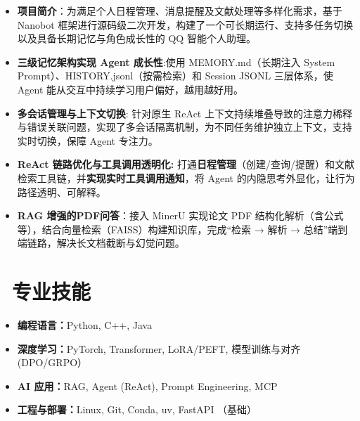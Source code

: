 \documentclass{resume}
\begin{document}
\begin{itemize}
  \item \textbf{项目简介}：为满足个人日程管理、消息提醒及文献处理等多样化需求，基于 Nanobot 框架进行源码级二次开发，构建了一个可长期运行、支持多任务切换以及具备长期记忆与角色成长性的 QQ 智能个人助理。
  \item \textbf{三级记忆架构实现 Agent 成长性}:使用 MEMORY.md（长期注入 System Prompt）、HISTORY.jsonl（按需检索）和 Session JSONL 三层体系，使 Agent 能从交互中持续学习用户偏好，越用越好用。
  \item \textbf{多会话管理与上下文切换}: 针对原生 ReAct 上下文持续堆叠导致的注意力稀释与错误关联问题，实现了多会话隔离机制，为不同任务维护独立上下文，支持实时切换，保障 Agent 专注力。
  \item \textbf{ReAct 链路优化与工具调用透明化: }打通\textbf{日程管理}（创建/查询/提醒）和文献检索工具链，并\textbf{实现实时工具调用通知}，将 Agent 的内隐思考外显化，让行为路径透明、可解释。
  \item \textbf{RAG 增强的PDF问答}：接入 MinerU 实现论文 PDF 结构化解析（含公式等），结合向量检索（FAISS）构建知识库，完成“检索 → 解析 → 总结”端到端链路，解决长文档截断与幻觉问题。
\end{itemize}


\section{\faCogs\ 专业技能}
\begin{itemize}[parsep=0.3ex, leftmargin=*]
  \item \textbf{编程语言：}Python, C++, Java
  \item \textbf{深度学习：}PyTorch, Transformer, LoRA/PEFT, 模型训练与对齐(DPO/GRPO）
  \item \textbf{AI 应用：}RAG, Agent (ReAct), Prompt Engineering, MCP
  \item \textbf{工程与部署：}Linux, Git, Conda, uv, FastAPI （基础）
  
\end{itemize}
\end{document}
